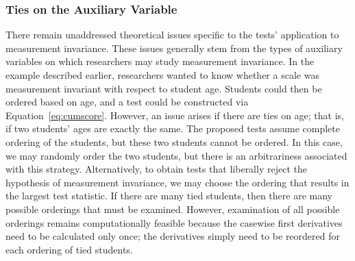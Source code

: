 \documentclass[man]{apa}
\begin{document}

\subsubsection{Ties on the Auxiliary Variable}
There remain unaddressed theoretical issues specific to the 
tests' application to measurement invariance.  These
issues generally stem from the types of auxiliary variables on which
researchers may study measurement invariance.  In
the example described earlier, researchers wanted to know whether a
scale was measurement invariant with respect to student age.
Students could then be ordered based on age, and a test could be 
constructed via Equation~\eqref{eq:cumscore}.  However, an issue arises if there
are ties on age; that is, if two students' ages are exactly
the same.  The proposed tests assume complete ordering of the
students, but these two students cannot be ordered.  In this case, we
may randomly order the two students, but there is an
arbitrariness associated with this strategy.  Alternatively, to obtain
tests that liberally reject the hypothesis of measurement invariance,
we may choose the ordering that results in the largest test
statistic.  If there are many tied students, then there are many
possible orderings that must be examined.  However, examination of all
possible orderings remains computationally feasible because the
casewise first derivatives need to be calculated only once; the
derivatives simply need to be reordered for each ordering of tied
students.
\end{document}
